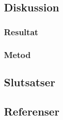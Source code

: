 \subsection{Diskussion}
\subsubsection{Resultat}
\subsubsection{Metod}
\subsection{Slutsatser}
\subsection{Referenser}
\vspace{-9mm}
\renewcommand{\refname}{}
\begin{thebibliography}{9}

\end{thebibliography}
